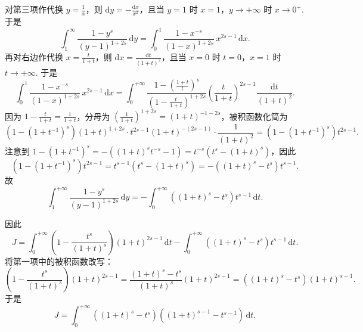 \begin{solution}
\begin{enumerate}
        对第三项作代换 \(\displaystyle y = \frac{1}{x}\)，则 \(\displaystyle \mathrm{d}y = -\frac{\mathrm{d}x}{x^{2}}\)，且当 \(y=1\) 时 \(x=1\)，\(y \to +\infty\) 时 \(x \to 0^{+}\). 于是
        \[
        \int_{1}^{\infty} \frac{1-y^{s}}{\left(y-1\right)^{1+2s}} \,\mathrm{d}y = \int_{0}^{1} \frac{1-x^{-s}}{\left(1-x\right)^{1+2s}} \, x^{2s-1} \,\mathrm{d}x.
        \]
        再对右边作代换 \(\displaystyle x = \frac{t}{1+t}\)，则 \(\displaystyle \mathrm{d}x = \frac{\mathrm{d}t}{\left(1+t\right)^{2}}\)，且当 \(x=0\) 时 \(t=0\)，\(x=1\) 时 \(t \to +\infty\). 于是
        \[
        \int_{0}^{1} \frac{1-x^{-s}}{\left(1-x\right)^{1+2s}} \, x^{2s-1} \,\mathrm{d}x = \int_{0}^{+\infty} \frac{1-\left(\frac{1+t}{t}\right)^{s}}{\left(1-\frac{t}{1+t}\right)^{1+2s}} \left(\frac{t}{1+t}\right)^{2s-1} \frac{\mathrm{d}t}{\left(1+t\right)^{2}}.
        \]
        因为 \(\displaystyle 1-\frac{t}{1+t} = \frac{1}{1+t}\)，分母为 \(\displaystyle \left(\frac{1}{1+t}\right)^{1+2s} = \left(1+t\right)^{-1-2s}\)，被积函数化简为
        \[
        \left(1-\left(1+t^{-1}\right)^{s}\right) \left(1+t\right)^{1+2s} \cdot t^{2s-1}\left(1+t\right)^{-\left(2s-1\right)} \cdot \frac{1}{\left(1+t\right)^{2}} = \left(1-\left(1+t^{-1}\right)^{s}\right) t^{2s-1}.
        \]
        注意到 \(1-\left(1+t^{-1}\right)^{s} = -\left(\left(1+t\right)^{s} t^{-s} - 1\right) = t^{-s} \left(t^{s} - \left(1+t\right)^{s}\right)\)，因此
        \[
        \left(1-\left(1+t^{-1}\right)^{s}\right) t^{2s-1} = t^{s-1} \left(t^{s} - \left(1+t\right)^{s}\right) = -\left(\left(1+t\right)^{s} - t^{s}\right) t^{s-1}.
        \]
        故
        \[
        \int_{1}^{+\infty} \frac{1-y^{s}}{\left(y-1\right)^{1+2s}} \,\mathrm{d}y = -\int_{0}^{+\infty} \left(\left(1+t\right)^{s} - t^{s}\right) t^{s-1} \,\mathrm{d}t.
        \]

        因此
        \[
        J = \int_{0}^{+\infty} \left(1-\frac{t^{s}}{\left(1+t\right)^{s}}\right) \left(1+t\right)^{2s-1} \,\mathrm{d}t - \int_{0}^{+\infty} \left(\left(1+t\right)^{s} - t^{s}\right) t^{s-1} \,\mathrm{d}t.
        \]
        将第一项中的被积函数改写：
        \[
        \left(1-\frac{t^{s}}{\left(1+t\right)^{s}}\right) \left(1+t\right)^{2s-1} = \frac{\left(1+t\right)^{s} - t^{s}}{\left(1+t\right)^{s}} \left(1+t\right)^{2s-1} = \left(\left(1+t\right)^{s} - t^{s}\right) \left(1+t\right)^{s-1}.
        \]
        于是
        \[
        J = \int_{0}^{+\infty} \left(\left(1+t\right)^{s} - t^{s}\right) \left(\left(1+t\right)^{s-1} - t^{s-1}\right) \,\mathrm{d}t.
        \]


\end{enumerate}
\end{solution}
